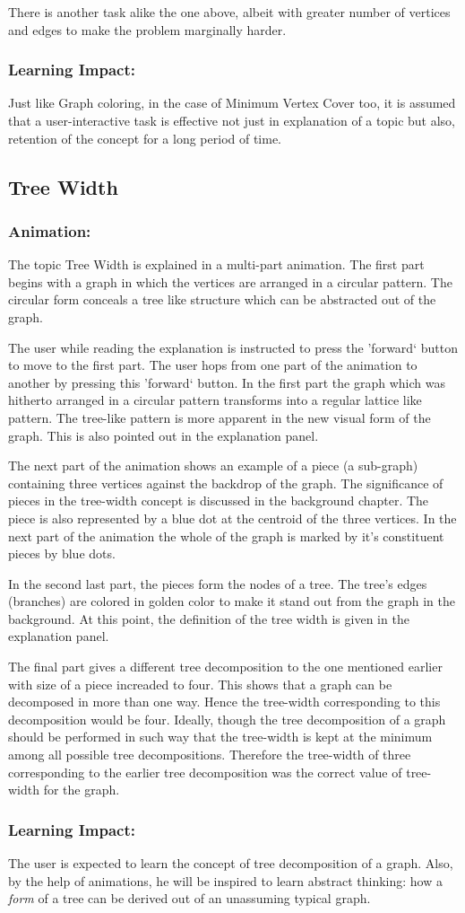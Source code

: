 There is another task alike the one above, albeit with greater
number of vertices and edges to make the problem marginally harder.

\subsubsection{Learning Impact:}
Just like Graph coloring, in the case of Minimum Vertex Cover too, it is
assumed that a user-interactive task is effective not just in explanation of a
topic but also, retention of the concept for a long period of time.

\subsection{Tree Width}
\subsubsection{Animation:}
The topic Tree Width is explained in a multi-part animation. The first part
begins with a graph in which the vertices are arranged in a circular pattern.
The circular form conceals a tree like structure which can be abstracted out of
the graph. 

The user while reading the explanation is instructed to press the 'forward`
button to move to the first part. The user hops from one part of the animation
to another by pressing this 'forward` button.  In the first part the graph
which was hitherto arranged in a circular pattern transforms into a regular
lattice like pattern. The tree-like pattern is more apparent in the new visual
form of the graph.  This is also pointed out in the explanation panel.  

The next part of the animation shows an example of a piece (a sub-graph)
containing three vertices against the backdrop of the graph. The significance
of pieces in the tree-width concept is discussed in the background chapter.
The piece is also represented by a blue dot at the centroid of the three
vertices. In the next part of the animation the whole of the graph is marked by
it's constituent pieces by blue dots. 

In the second last part, the pieces form the nodes of a tree. The tree's edges
(branches) are colored in golden color to make it stand out from the graph in
the background. At this point, the definition of the tree width is given in
the explanation panel.

The final part gives a different tree decomposition to the one mentioned
earlier with size of a piece increaded to four. This shows that a graph can be
decomposed in more than one way. Hence the tree-width corresponding to this
decomposition would be four. Ideally, though the tree decomposition of a graph
should be performed in such way that the tree-width is kept at the minimum
among all possible tree decompositions. Therefore the tree-width of three
corresponding to the earlier tree decomposition was the correct value of
tree-width for the graph.

\subsubsection{Learning Impact:}
The user is expected to learn the concept of tree decomposition of a graph.
Also, by the help of animations, he will be inspired to learn abstract
thinking: how a \emph{form} of a tree can be derived out of an unassuming
typical graph.
